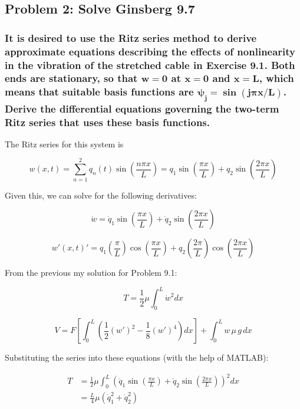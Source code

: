 \documentclass[12pt, letterpaper]{../assignment}
\begin{document}
\subsection*{Problem 2: Solve Ginsberg 9.7}
\subsubsection*{It is desired to use the Ritz series method to derive approximate equations describing the effects of nonlinearity in the vibration of the stretched cable in Exercise 9.1.
Both ends are stationary,
so that $\bm{w = 0}$ at $\bm{x = 0}$ and $\bm{x = L}$,
which means that suitable basis functions are $\bm{\psi_j = \sin(j \pi x/L)}$.
Derive the differential equations governing the two-term Ritz series that uses these basis functions.}

The Ritz series for this system is

$$ w(x,t) = \sum_{n=1}^2 q_n(t) \sin\left(\frac{n \pi x}{L}\right) = 
q_1 \sin\left(\frac{\pi x}{L}\right) + q_2 \sin\left(\frac{2 \pi x}{L}\right)$$

Given this, we can solve for the following derivatives:

$$ \dot{w} =
\dot{q}_1 \sin\left(\frac{\pi x}{L}\right) + \dot{q}_2 \sin\left(\frac{2 \pi x}{L}\right)$$

$$ w'(x,t)' =
q_1 \left(\frac{\pi}{L}\right) \cos\left(\frac{\pi x}{L}\right) + q_2 \left(\frac{2 \pi }{L}\right) \cos\left(\frac{2 \pi x}{L}\right)$$

From the previous my solution for Problem 9.1: 


$$ T = \frac{1}{2}\mu \int_0^L \dot{w}^2 dx $$

$$V = F \left[ \int_0^L \left( \frac{1}{2}(w')^2 - \frac{1}{8}(w')^4 \right) dx \right] + \int_0^L w\,\mu\,g\, dx $$

Substituting the series into these equations (with the help of MATLAB):

\begin{equation*}
  \begin{aligned}
    T &= \frac{1}{2}\mu \int_0^L \left( \dot{q}_1 \sin\left(\frac{\pi x}{L}\right) + \dot{q}_2 \sin\left(\frac{2 \pi x}{L}\right) \right)^2 dx \\
    &= \frac{L}{4}\mu \left( \dot{q}_1^2 + \dot{q}_2^2 \right)
  \end{aligned}
\end{equation*}
\end{document}
